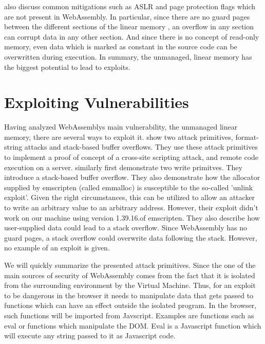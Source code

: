 \documentclass[sigconf]{acmart}
\begin{document}
\cite{lehmann_everything_2020} also discuss common mitigations such as ASLR and page protection flags which are not present in WebAssembly. In particular, since there are no guard pages between the different sections of the linear memory , an overflow in any section can corrupt data in any other section. And since there is no concept of read-only memory, even data which is marked as constant in the source code can be overwritten during execution. In summary, the unmanaged, linear memory has the biggest potential to lead to exploits.

\section{Exploiting Vulnerabilities}
Having analyzed WebAssemblys main vulnerability, the unmanaged linear memory, there are several ways to exploit it. \cite{mcfadden_security_2018} show two attack primitives, format-string attacks and stack-based buffer overflows. They use these attack primitives to implement a proof of concept of a cross-site scripting attack, and remote code execution on a server.
\cite{lehmann_everything_2020} similarly first demonstrate two write primitves. They introduce a stack-based buffer overflow. They also demonstrate how the allocator supplied by emscripten (called emmalloc) is susceptible to the so-called 'unlink exploit'. Given the right circumstances, this can be utilized to allow an attacker to write an arbitrary value to an arbitrary address. However, their exploit didn't work on our machine using version 1.39.16.of emscripten. They also describe how user-supplied data could lead to a stack overflow. Since WebAssembly has no guard pages, a stack overflow could overwrite data following the stack. However, no example of an exploit is given. 

We will quickly summarize the presented attack primitives. Since the one of the main sources of security of WebAssembly comes from the fact that it is isolated from the surrounding environment by the Virtual Machine. Thus, for an exploit to be dangerous in the browser it needs to manipulate data that gets passed to functions which can have an effect outside the isolated program. In the browser, such functions will be imported from Javscript. Examples are functions such as eval or functions which manipulate the DOM.
Eval is a Javascript function which will execute any string passed to it as Javascript code. 
\end{document}
